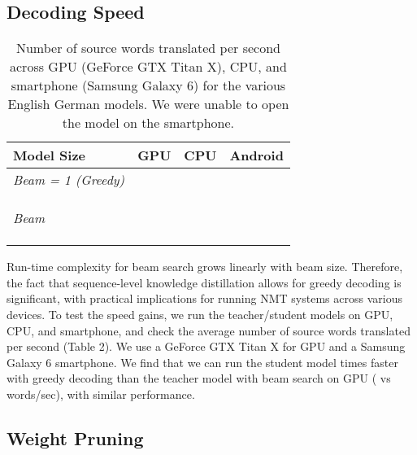 \documentclass[11pt,letterpaper]{article}
\begin{document}
\subsection{Decoding Speed}
\begin{table}[t] \label{speed}
\centering
\small
\begin{tabular}{l  r  r  r  }
\toprule
Model Size  & GPU & CPU & Android \\
\midrule
\textit{Beam = 1 (Greedy)}\\
\midrule 
 && &    \\
 && &   \\
& & &   \\
\midrule
\textit{Beam } \\
\midrule
 & &  &   \\
 & &   &  \\
 & &   & \\
\bottomrule
\end{tabular}
\caption{Number of source words translated per second across GPU (GeForce GTX Titan X), 
CPU, and smartphone (Samsung Galaxy 6) for the various English  German models. 
We were unable to open the  model on the smartphone.}
\end{table}

Run-time complexity for beam search grows linearly with beam size. Therefore,
the fact that sequence-level knowledge distillation allows for greedy decoding  is 
 significant, with practical implications for running NMT systems across various devices. 
 To test the  speed gains,
we run the teacher/student models on GPU, CPU, and smartphone, and check the average
number of source words translated per second (Table 2). We use a GeForce GTX Titan X for 
GPU and a Samsung Galaxy 6 smartphone. We find that we can run the
student model  times faster with greedy decoding than the teacher model with beam search 
on GPU ( vs  words/sec), with similar performance.


\subsection{Weight Pruning}
\end{document}
